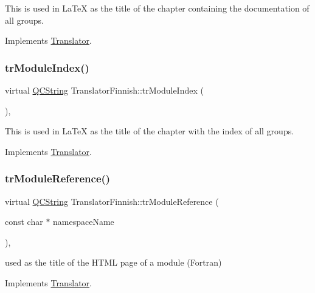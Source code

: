 This is used in La\+TeX as the title of the chapter containing the documentation of all groups. 

Implements \mbox{\hyperlink{class_translator}{Translator}}.

\mbox{\label{class_translator_finnish_a286652700143ff0b80f25a4bfea44ffb}} 
\subsubsection{\texorpdfstring{trModuleIndex()}{trModuleIndex()}}
{\footnotesize\ttfamily virtual \mbox{\hyperlink{class_q_c_string}{Q\+C\+String}} Translator\+Finnish\+::tr\+Module\+Index (\begin{DoxyParamCaption}{ }\end{DoxyParamCaption})\hspace{0.3cm}{\ttfamily [inline]}, {\ttfamily [virtual]}}

This is used in La\+TeX as the title of the chapter with the index of all groups. 

Implements \mbox{\hyperlink{class_translator}{Translator}}.

\mbox{\label{class_translator_finnish_a703aecde36fe9c1501aebdc7059bfbbf}} 
\subsubsection{\texorpdfstring{trModuleReference()}{trModuleReference()}}
{\footnotesize\ttfamily virtual \mbox{\hyperlink{class_q_c_string}{Q\+C\+String}} Translator\+Finnish\+::tr\+Module\+Reference (\begin{DoxyParamCaption}\item[{const char $\ast$}]{namespace\+Name }\end{DoxyParamCaption})\hspace{0.3cm}{\ttfamily [inline]}, {\ttfamily [virtual]}}

used as the title of the H\+T\+ML page of a module (Fortran) 

Implements \mbox{\hyperlink{class_translator}{Translator}}.

